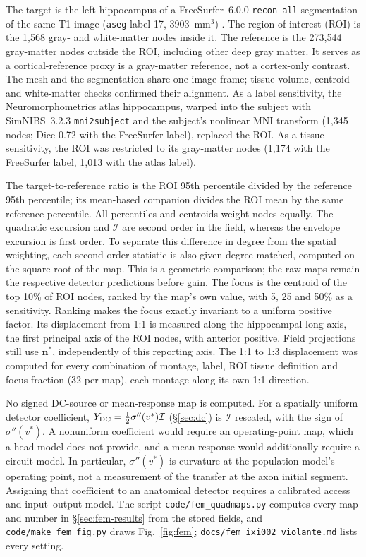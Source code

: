 \documentclass[11pt,a4paper]{article}
\newcommand{\Sig}{\sigma}
\providecommand{\DIFaddtex}[1]{{\protect\color{blue} \sf #1}} %
\providecommand{\DIFdeltex}[1]{{\protect\color{red} \scriptsize #1}} %
\providecommand{\DIFaddbegin}{} %
\providecommand{\DIFaddend}{} %
\providecommand{\DIFdelbegin}{} %
\providecommand{\DIFdelend}{} %
\providecommand{\DIFadd}[1]{\texorpdfstring{\DIFaddtex{#1}}{#1}} %
\providecommand{\DIFdel}[1]{\texorpdfstring{\DIFdeltex{#1}}{}} %
\begin{document}
The target is the left hippocampus of a FreeSurfer~6.0.0 \texttt{recon-all}
segmentation of the same T1 image (\texttt{aseg} label 17, 3903~mm$^3$)
\cite{fischl2002}. The region of interest (ROI) is the 1{,}568 gray- and white-matter
nodes inside it. The reference is the 273{,}544 gray-matter nodes outside the
ROI, including other deep gray matter. It \DIFdelbegin \DIFdel{serves as a cortical-reference proxy}\DIFdelend \DIFaddbegin \DIFadd{is a gray-matter reference, not a cortex-only contrast}\DIFaddend .
The mesh and the segmentation share one image frame; tissue-volume, centroid and
white-matter checks confirmed their alignment. As a label sensitivity, the
Neuromorphometrics atlas hippocampus, warped into the subject with SimNIBS~3.2.3
\texttt{mni2subject} and the subject's nonlinear MNI transform (1{,}345 nodes; Dice 0.72
with the FreeSurfer label), replaced the ROI. As a tissue sensitivity, the ROI was
restricted to its gray-matter nodes (1{,}174 with the FreeSurfer label, 1{,}013 with
the atlas label).

The target-to-reference ratio is the ROI 95th percentile divided by the reference
95th percentile; its mean-based companion divides the ROI mean by the same
reference percentile. All percentiles and centroids weight nodes equally.
The quadratic excursion and $\mathcal I$ are second order in the field, whereas
the envelope excursion is first order. To separate this difference in degree
from the spatial weighting, each second-order statistic is also given
degree-matched, computed on the square root of the map. This is a geometric
comparison; the raw maps remain the respective detector predictions before gain.
The focus is the centroid of the top 10\% of ROI nodes,
ranked by the map's own value, with 5, 25 and 50\% as a sensitivity. Ranking makes the
focus exactly invariant to a uniform positive factor. Its displacement from 1:1 is
measured along the hippocampal long axis, the first principal axis of the ROI nodes,
with anterior positive. Field projections still use $\mathbf n^*$, independently
of this reporting axis. The 1:1 to 1:3 displacement was computed for every combination
of montage, label, ROI tissue definition and focus fraction (32 per map), each montage
along its own 1:1 direction.

No signed DC-source or mean-response map is computed. For a spatially uniform detector
coefficient, $Y_{\rm DC}=\tfrac12\Sig''(v^*)\mathcal I$ (\S\ref{sec:dc}) is
$\mathcal I$ rescaled, with the sign of $\Sig''(v^*)$. A nonuniform coefficient would
require an operating-point map, which a head model does not provide, and a mean
response would additionally require a circuit model. In particular,
$\Sig''(v^*)$ is curvature at the population model's operating point, not a
measurement of the transfer at the axon initial segment. Assigning that
coefficient to an anatomical detector requires a calibrated access and
input--output model.
\DIFdelbegin \DIFdel{The script
\texttt{code/fem\_quadmaps.py} computes every map and number in
\S\ref{sec:fem-results} from the stored fields, and \texttt{code/make\_fem\_fig.py}
draws Fig.~\ref{fig:fem}; \texttt{docs/fem\_ixi002\_violante.md} lists every setting.
}\DIFdelend
\end{document}
